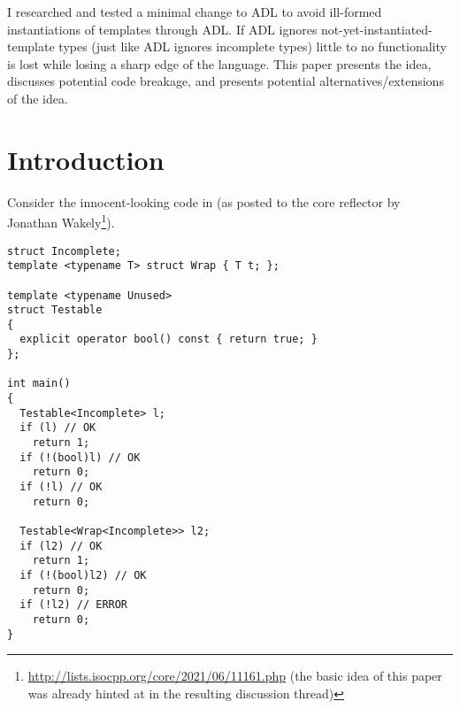 \newcommand\wgTitle{A minimal ADL restriction to avoid ill-formed template instantiation}
\newcommand\wgName{Matthias Kretz <m.kretz@gsi.de>}
\newcommand\wgDocumentNumber{P2600R0}
\newcommand\wgGroup{EWGI, EWG}
\newcommand\wgTarget{\CC{}26}

\usepackage{mymacros}
\usepackage{wg21}
\usepackage{changelog}
\usepackage{underscore}



\newcommand\wglink[1]{\href{https://wg21.link/#1}{#1}}
\newcommand\notyetinstantiated{not\hyp{}yet\hyp{}instantiated\hyp{}template}


\begin{wgTitlepage}
  I researched and tested a minimal change to ADL to avoid ill-formed instantiations of 
  templates through ADL. If ADL ignores \notyetinstantiated{} types (just like ADL ignores 
  incomplete types) little to no functionality is lost while losing a sharp edge of the 
  language. This paper presents the idea, discusses potential code breakage, and presents 
  potential alternatives/extensions of the idea.
\end{wgTitlepage}

\pagestyle{scrheadings}

%

%

\section{Introduction}

Consider the innocent-looking code in  (as posted to the core reflector by 
Jonathan Wakely\footnote{\url{http://lists.isocpp.org/core/2021/06/11161.php} (the basic 
idea of this paper was already hinted at in the resulting discussion thread)}).
\begin{lstlisting}[style=Vc,float={hb},label=lst:example1,caption={
Ill-formed instantiation of \type{Wrap<Incomplete>} because of ADL
}]
struct Incomplete;
template <typename T> struct Wrap { T t; };

template <typename Unused>
struct Testable
{
  explicit operator bool() const { return true; }
};

int main()
{
  Testable<Incomplete> l;
  if (l) // OK
    return 1;
  if (!(bool)l) // OK
    return 0;
  if (!l) // OK
    return 0;

  Testable<Wrap<Incomplete>> l2;
  if (l2) // OK
    return 1;
  if (!(bool)l2) // OK
    return 0;
  if (!l2) // ERROR
    return 0;
}
\end{lstlisting}

